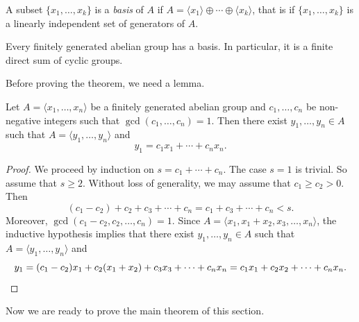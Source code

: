 A subset $\{x_1,\dots,x_k\}$ is a \emph{basis} of $A$ 
if $A=\langle x_1\rangle\oplus\cdots\oplus \langle x_k\rangle$, that is
if $\{x_1,\dots,x_k\}$ is a 
linearly independent set of generators of $A$. 


\begin{theorem}
\label{thm:fundamental_abelian}
    Every finitely generated abelian group has a basis. In particular, 
    it is a finite direct sum of cyclic groups. 
\end{theorem}

Before proving the theorem, we need a lemma.

\begin{lemma}
\label{lem:trick_abelian}
    Let $A=\langle x_1,\dots,x_n\rangle$ be a finitely generated 
    abelian group and $c_1,\dots,c_n$ be non-negative integers such that 
    $\gcd(c_1,\dots,c_n)=1$. Then there exist $y_1,\dots,y_n\in A$ 
    such that 
    $A=\langle y_1,\dots,y_n\rangle$ and 
    \[ 
    y_1=c_1x_1+\cdots+c_nx_n.
    \]
\end{lemma}

\begin{proof}
    We proceed by induction on $s=c_1+\cdots+c_n$. The case $s=1$ is trivial. 
    So assume that $s\geq2$. Without loss of generality, we may assume that 
    $c_1\geq c_2>0$. Then 
    \[ 
    (c_1-c_2)+c_2+c_3+\cdots+c_n=c_1+c_3+\cdots+c_n<s.
    \]
    Moreover, $\gcd(c_1-c_2,c_2,\dots,c_n)=1$. Since $A=\langle x_1,x_1+x_2,x_3,\dots,x_n\rangle$, the inductive hypothesis implies that 
    there exist $y_1,\dots,y_n\in A$ such that 
    $A=\langle y_1,\dots,y_n\rangle$ and 
    \[ 
        y_1=(c_1-c_2)x_1+c_2(x_1+x_2)+c_3x_3+\cdots+c_nx_n
        =c_1x_1+c_2x_2+\cdots+c_nx_n.\qedhere
    \]
\end{proof}

Now we are ready to prove the main theorem of this section. 

